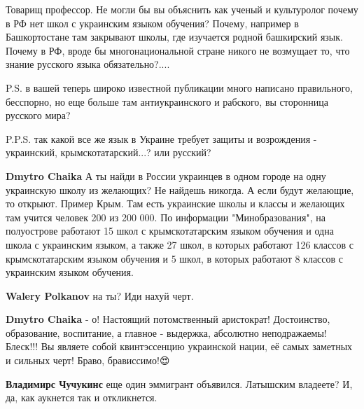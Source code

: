 \begin{itemize}
Товарищ профессор. Не могли бы вы объяснить как ученый и культуролог почему в
РФ нет школ с украинским языком обучения? Почему, например в Башкортостане там
закрывают школы, где изучается родной башкирский язык. Почему в РФ, вроде бы
многонациональной стране никого не возмущает то, что знание русского языка
обязательно?.... 

P.S. в вашей теперь широко известной публикации много написано правильного,
бесспорно, но еще больше там антиукраинского и рабского, вы сторонница русского
мира? 

P.P.S. так какой все же язык в Украине требует защиты и возрождения -
украинский, крымскотатарский...? или русский?

\begin{itemize}

\textbf{Dmytro Chaika} А ты найди в России украинцев в одном городе на одну
украинскую школу из желающих? Не найдешь никогда. А если будут желающие, то
открыют. Пример Крым. Там есть украинские школы и классы и желающих там учится
человек 200 из 200 000. По информации "Минобразования", на полуострове работают
15 школ с крымскотатарским языком обучения и одна школа с украинским языком, а
также 27 школ, в которых работают 126 классов с крымскотатарским языком
обучения и 5 школ, в которых работают 8 классов с украинским языком обучения.


\textbf{Walery Polkanov} на ты? Иди нахуй черт.


\textbf{Dmytro Chaika} - о! Настоящий потомственный аристократ! Достоинство,
образование, воспитание, а главное - выдержка, абсолютно неподражаемы! Блеск!!!
Вы являете собой квинтэссенцию украинской нации, её самых заметных и сильных
черт! Браво, брависсимо!😍


\textbf{Владимирс Чучукинс} еще один эммигрант объявился. Латышским владеете? И, да, как аукнется так и откликнется.
\end{itemize}


\end{itemize}
